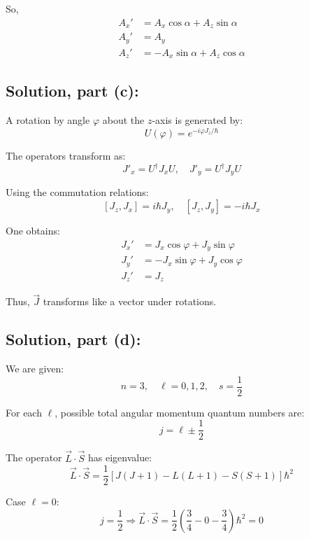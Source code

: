 \documentclass[12pt]{article}
\begin{document}
        So,
        \[
            \begin{aligned}
                A_x' &= A_x \cos \alpha + A_z \sin \alpha \\
                A_y' &= A_y \\
                A_z' &= -A_x \sin \alpha + A_z \cos \alpha
            \end{aligned}
        \]
        
    \subsection{Solution, part (c):}
        A rotation by angle \( \varphi \) about the \( z \)-axis is generated by:
        \[
            U(\varphi) = e^{-i \varphi J_z / \hbar}
        \]
        
        The operators transform as:
        \[
            J'_x = U^\dagger J_x U, \quad J'_y = U^\dagger J_y U
        \]
        
        Using the commutation relations:
        \[
            [J_z, J_x] = i \hbar J_y, \quad [J_z, J_y] = -i \hbar J_x
        \]
        
        One obtains:
        \[
            \begin{aligned}
                J_x' &= J_x \cos \varphi + J_y \sin \varphi \\
                J_y' &= -J_x \sin \varphi + J_y \cos \varphi \\
                J_z' &= J_z
            \end{aligned}
        \]
        
        Thus, \( \vec{J} \) transforms like a vector under rotations.

    \subsection{Solution, part (d):}
        We are given:
        \[
            n = 3, \quad \ell = 0, 1, 2, \quad s = \frac{1}{2}
        \]
        
        For each \( \ell \), possible total angular momentum quantum numbers are:
        \[
            j = \ell \pm \frac{1}{2}
        \]
        
        The operator \( \vec{L} \cdot \vec{S} \) has eigenvalue:
        \[
            \vec{L} \cdot \vec{S} = \frac{1}{2} \left[ J(J+1) - L(L+1) - S(S+1) \right] \hbar^2
        \]
        
        Case \( \ell = 0 \):
        \[
            j = \frac{1}{2} \Rightarrow \vec{L} \cdot \vec{S} = \frac{1}{2} \left( \frac{3}{4} - 0 - \frac{3}{4} \right) \hbar^2 = 0
        \]
        
\end{document}
